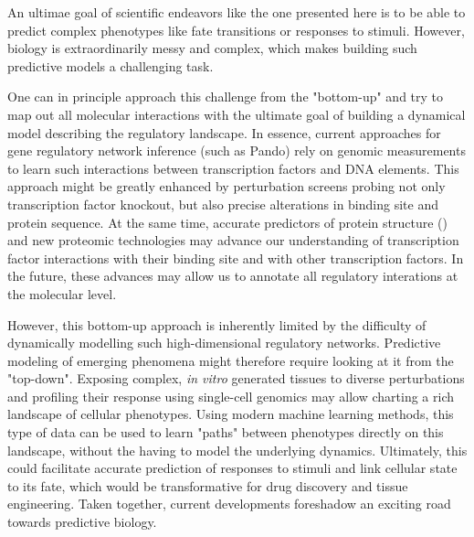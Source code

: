 An ultimae goal of scientific endeavors like the one presented here is to be able to predict complex phenotypes like fate transitions or responses to stimuli. However, biology is extraordinarily messy and complex, which makes building such predictive models a challenging task.

One can in principle approach this challenge from the "bottom-up" and try to map out all molecular interactions with the ultimate goal of building a dynamical model describing the regulatory landscape. In essence, current approaches for gene regulatory network inference (such as Pando) rely on genomic measurements to learn such interactions between transcription factors and DNA elements. This approach might be greatly enhanced by perturbation screens probing not only transcription factor knockout, but also precise alterations in binding site and protein sequence. At the same time, accurate predictors of protein structure (\cite{baek_accurate_2021,jumper_highly_2021}) and new proteomic technologies may advance our understanding of transcription factor interactions with their binding site and with other transcription factors. In the future, these advances may allow us to annotate all regulatory interations at the molecular level. 

However, this bottom-up approach is inherently limited by the difficulty of dynamically modelling such high-dimensional regulatory networks. Predictive modeling of emerging phenomena might therefore require looking at it from the "top-down". Exposing complex, \textit{in vitro} generated tissues to diverse perturbations and profiling their response using single-cell genomics may allow charting a rich landscape of cellular phenotypes. Using modern machine learning methods, this type of data can be used to learn "paths" between phenotypes directly on this landscape, without the having to model the underlying dynamics. Ultimately, this could facilitate accurate prediction of responses to stimuli and link cellular state to its fate, which would be transformative for drug discovery and tissue engineering. Taken together, current developments foreshadow an exciting road towards predictive biology.


